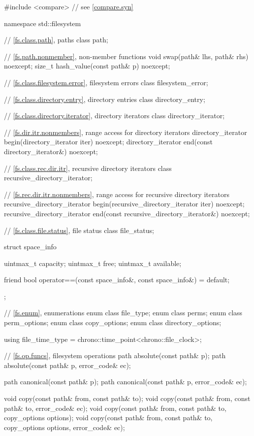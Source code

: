 %
\begin{codeblock}
#include <compare>              // see \ref{compare.syn}

namespace std::filesystem {
  // \ref{fs.class.path}, paths
  class path;

  // \ref{fs.path.nonmember},  non-member functions
  void swap(path& lhs, path& rhs) noexcept;
  size_t hash_value(const path& p) noexcept;

  // \ref{fs.class.filesystem.error}, filesystem errors
  class filesystem_error;

  // \ref{fs.class.directory.entry}, directory entries
  class directory_entry;

  // \ref{fs.class.directory.iterator}, directory iterators
  class directory_iterator;

  // \ref{fs.dir.itr.nonmembers}, range access for directory iterators
  directory_iterator begin(directory_iterator iter) noexcept;
  directory_iterator end(const directory_iterator&) noexcept;

  // \ref{fs.class.rec.dir.itr}, recursive directory iterators
  class recursive_directory_iterator;

  // \ref{fs.rec.dir.itr.nonmembers}, range access for recursive directory iterators
  recursive_directory_iterator begin(recursive_directory_iterator iter) noexcept;
  recursive_directory_iterator end(const recursive_directory_iterator&) noexcept;

  // \ref{fs.class.file.status}, file status
  class file_status;

  struct space_info {
    uintmax_t capacity;
    uintmax_t free;
    uintmax_t available;

    friend bool operator==(const space_info&, const space_info&) = default;
  };

  // \ref{fs.enum}, enumerations
  enum class file_type;
  enum class perms;
  enum class perm_options;
  enum class copy_options;
  enum class directory_options;

  using file_time_type = chrono::time_point<chrono::file_clock>;

  // \ref{fs.op.funcs}, filesystem operations
  path absolute(const path& p);
  path absolute(const path& p, error_code& ec);

  path canonical(const path& p);
  path canonical(const path& p, error_code& ec);

  void copy(const path& from, const path& to);
  void copy(const path& from, const path& to, error_code& ec);
  void copy(const path& from, const path& to, copy_options options);
  void copy(const path& from, const path& to, copy_options options,
            error_code& ec);

}
\end{codeblock}
